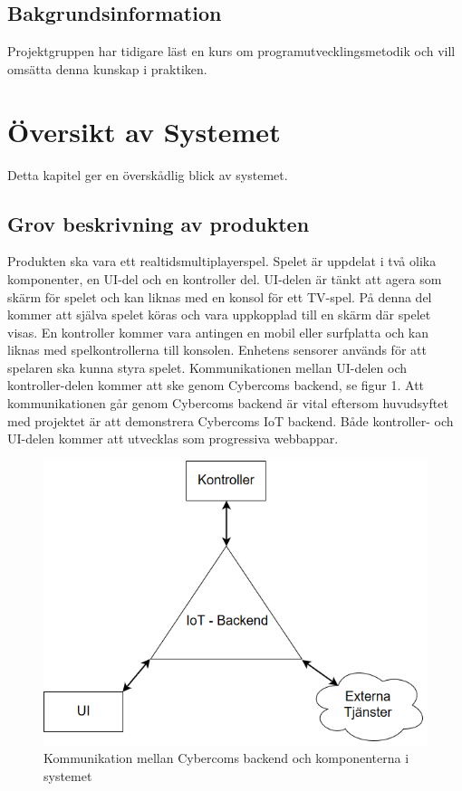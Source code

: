 \documentclass[10pt]{article}
\begin{document}
	\subsection{Bakgrundsinformation}
		Projektgruppen har tidigare läst en kurs om programutvecklingsmetodik och vill omsätta denna kunskap i praktiken. 
		
\pagebreak
\section{Översikt av Systemet}
	Detta kapitel ger en överskådlig blick av systemet.

	\subsection{Grov beskrivning av produkten}
	Produkten ska vara ett realtidsmultiplayerspel. Spelet är uppdelat i två olika komponenter, en UI-del och en kontroller del. UI-delen är tänkt att agera som skärm för spelet och kan liknas med en konsol för ett TV-spel. På denna del kommer att själva spelet köras och vara uppkopplad till en skärm där spelet visas. En kontroller kommer vara antingen en mobil eller surfplatta och kan liknas med spelkontrollerna till konsolen. Enhetens sensorer används för att spelaren ska kunna styra spelet. Kommunikationen mellan UI-delen och kontroller-delen kommer att ske genom Cybercoms backend, se figur 1. Att kommunikationen går genom Cybercoms backend är vital eftersom huvudsyftet med projektet är att demonstrera Cybercoms IoT backend.  Både kontroller- och UI-delen kommer att utvecklas som progressiva webbappar. 
	
	\begin{figure}[h]
		\centering
		\includegraphics[scale=0.4]{backend}
		\caption{Kommunikation mellan Cybercoms backend och komponenterna i systemet}
		\label{fig:backend}
	\end{figure}
	
\end{document}
